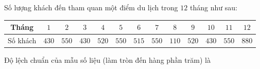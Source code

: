 \begin{ex}
Số lượng khách đến tham quan một điểm du lịch trong $12$ tháng như sau:
\begin{center}
\begin{tabular}{|c|c|c|c|c|c|c|c|c|c|c|c|c|}\hline
Tháng & $1$ & $2$ & $3$ & $4$ & $5$ & $6$ & $7$ & $8$ & $9$ & $10$ & $11$ & $12$\\\hline
Số khách & $430$ & $550$ & $430$ & $520$ & $550$ & $515$ & $550$ & $110$ & $520$ & $430$ & $550$ & $880$\\\hline
\end{tabular}
\end{center}
Độ lệch chuẩn của mẫu số liệu (làm tròn đến hàng phần trăm) là
\end{ex}
